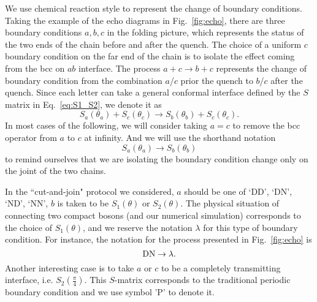 
We use chemical reaction style to represent the change of boundary conditions. Taking the example of the echo diagrams in Fig.~\ref{fig:echo}, there are three boundary conditions $a,b,c$ in the folding picture, which represents the status of the two ends of the chain before and after the quench. The choice of a uniform $c$ boundary condition on the far end of the chain is to isolate the effect coming from the bcc on $ab$ interface. The process $a + c \rightarrow b + c$ represents the change of boundary condition from the combination $a$/$c$ prior the quench to $b$/$c$ after the quench. Since each letter can take a general conformal interface defined by the $S$ matrix in Eq.~\eqref{eq:S1_S2}, we denote it as
\begin{equation}
\label{eq:Full_notation_rand()}
S_a( \theta_a ) + S_c( \theta_c) \rightarrow S_b( \theta_b )  + S_c( \theta_c ) .
\end{equation}
In most cases of the following, we will consider taking $a = c$ to remove the bcc operator from $a$ to $c$ at infinity. And we will use the shorthand notation
\begin{equation}
S_a( \theta_a ) \rightarrow S_b( \theta_b )
\end{equation}
to remind ourselves that we are isolating the boundary condition change only on the joint of the two chains. 

In the ``cut-and-join" protocol we considered, $a$ should be one of `DD', `DN', `ND', `NN', $b$ is taken to be $S_1( \theta )$ or $S_2( \theta )$. The physical situation of connecting two compact bosons (and our numerical simulation) corresponds to the choice of $S_1( \theta)$, and we reserve the notation $\lambda$ for this type of boundary condition. For instance, the notation for the process presented in Fig.~\ref{fig:echo} is
\begin{equation}
\label{eq:DNDN}
 {\rm DN} \rightarrow \lambda.
\end{equation}
Another interesting case is to take $a$ or $c$ to be a completely transmitting interface, i.e. $S_2( \frac{\pi}{4} )$. This $S$-matrix corresponds to the traditional periodic boundary condition and we use symbol 'P' to denote it. 


